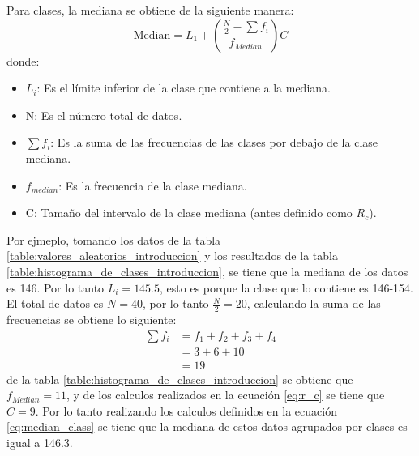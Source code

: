 Para clases, la mediana se obtiene de la siguiente manera:
\begin{equation}
    \text{Median}= L_1+\left(\frac{\frac{N}{2}-\sum f_i}{f_{Median}}\right)C
    \label{eq:median_class}
\end{equation}
donde: \begin{itemize}
    \item $L_i$: Es el límite inferior de la clase que contiene a la mediana.
    \item N: Es el número total de datos.
    \item $\sum f_i$: Es la suma de las frecuencias de las clases por debajo de la clase mediana.
    \item $f_{median}$: Es la frecuencia de la clase mediana.
    \item C: Tamaño del intervalo de la clase mediana (antes definido como $R_c$).
\end{itemize}

Por ejmeplo, tomando los datos de la tabla \ref{table:valores_aleatorios_introduccion} y los resultados de la tabla \ref{table:histograma_de_clases_introduccion}, se tiene que la mediana de los datos es 146. Por lo tanto $L_i=145.5$, esto es porque la clase que lo contiene es 146-154. El total de datos es $N=40$, por lo tanto $\frac{N}{2}=20$, calculando la suma de las frecuencias se obtiene lo siguiente:
\begin{align*}
    \sum f_i & = f_1 + f_2 +f_3+f_4 \\
             & = 3 + 6 + 10         \\
             & =19
\end{align*}
de la tabla \ref{table:histograma_de_clases_introduccion} se obtiene que $f_{Median}=11$, y de los calculos realizados en la ecuación \ref{eq:r_c} se tiene que $C=9$. Por lo tanto realizando los calculos definidos en la ecuación \ref{eq:median_class} se tiene  que la mediana de estos datos agrupados por clases es igual a 146.3.

